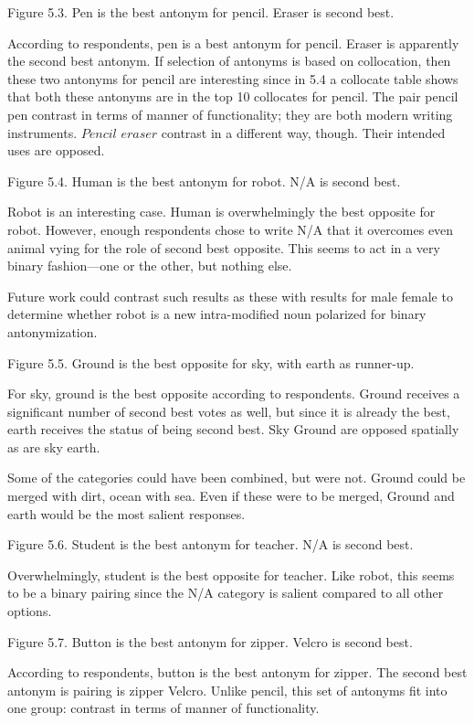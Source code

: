 	Figure 5.3. Pen is the best antonym for pencil. Eraser is second best.

According to respondents, pen is a best antonym for pencil.  Eraser is apparently the second best antonym.  If selection of antonyms is based on collocation, then these two antonyms for pencil are interesting since in 5.4 a collocate table shows that both these antonyms are in the top 10 collocates for pencil.  The pair pencil \opp pen contrast in terms of manner of functionality; they are both modern writing instruments.  $Pencil$ \opp $eraser$ contrast in a different way, though.  Their intended uses are opposed.


	Figure 5.4. Human is the best antonym for robot.  N/A is second best.

Robot is an interesting case.  Human is overwhelmingly the best opposite for robot.  However, enough respondents chose to write N/A that it overcomes even animal vying for the role of second best opposite.  This seems to act in a very binary fashion—one or the other, but nothing else.  

Future work could contrast such results as these with results for male \opp female to determine whether robot is a new intra-modified noun polarized for binary antonymization.


	Figure 5.5. Ground is the best opposite for sky, with earth as runner-up.

For sky, ground is the best opposite according to respondents.  Ground receives a significant number of second best votes as well, but since it is already the best, earth receives the status of being second best.  Sky \opp Ground are opposed spatially as are sky \opp earth.  

Some of the categories could have been combined, but were not. Ground could be merged with dirt, ocean with sea.  Even if these were to be merged, Ground and earth would be the most salient responses.


	Figure 5.6. Student is the best antonym for teacher.  N/A is second best.

Overwhelmingly, student is the best opposite for teacher.  Like robot, this seems to be a binary pairing since the N/A category is salient compared to all other options.



	Figure 5.7. Button is the best antonym for zipper. Velcro is second best.

According to respondents, button is the best antonym for zipper.  The second best antonym is pairing is zipper \opp Velcro.  Unlike pencil, this set of antonyms fit into one group: contrast in terms of manner of functionality.  

